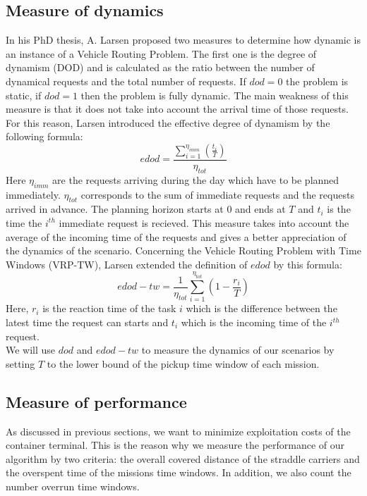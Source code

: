 \documentclass[a4paper,10pt]{article}
\begin{document}
	\subsection{Measure of dynamics}
In his PhD thesis\cite{Larsen00}, A. Larsen proposed two measures to determine how dynamic is an instance of a Vehicle Routing Problem. The first one is the degree of dynamism (DOD) and is calculated as the ratio between the number of dynamical requests and the total number of requests. If $dod=0$ the problem is static, if $dod=1$ then the problem is fully dynamic. The main weakness of this measure is that it does not take into account the arrival time of those requests. For this reason, Larsen introduced the effective degree of dynamism by the following formula: 
\begin{equation*}
 edod = \frac{\sum_{i=1}^{\eta_{imm}}\left(\frac{t_i}{T}\right)}{\eta_{tot}}
\end{equation*}
Here $\eta_{imm}$ are the requests arriving during the day which have to be planned immediately. $\eta_{tot}$ corresponds to the sum of immediate requests and the requests arrived in advance. The planning horizon starts at $0$ and ends at $T$ and $t_i$ is the time the $i^{th}$ immediate request is recieved. This measure takes into account the average of the incoming time of the requests and gives a better appreciation of the dynamics of the scenario.
Concerning the Vehicle Routing Problem with Time Windows (VRP-TW), Larsen extended the definition of $edod$ by this formula: 
\begin{equation*}
 edod-tw = \frac{1}{\eta_{tot}} \sum_{i=1}^{\eta_{tot}} \left(1 - \frac{r_i}{T}\right)
\end{equation*}
Here, $r_i$ is the reaction time of the task $i$ which is the difference between the latest time the request can starts and $t_i$ which is the incoming time of the $i^{th}$ request.\\

We will use $dod$ and $edod-tw$ to measure the dynamics of our scenarios by setting $T$ to the lower bound of the pickup time window of each mission.

	\subsection{Measure of performance}
As discussed in previous sections, we want to minimize exploitation costs of the container terminal. This is the reason why we measure the performance of our algorithm by two criteria: the overall covered distance of the straddle carriers and the overspent time of the missions time windows. In addition, we also count the number overrun time windows.
\end{document}
